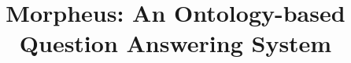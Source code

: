 \documentclass{sig-alternate}
\begin{document}
%

\title{{\ttlit Morpheus}: An Ontology-based Question Answering System}

%
%
%
%
%
\end{document}
